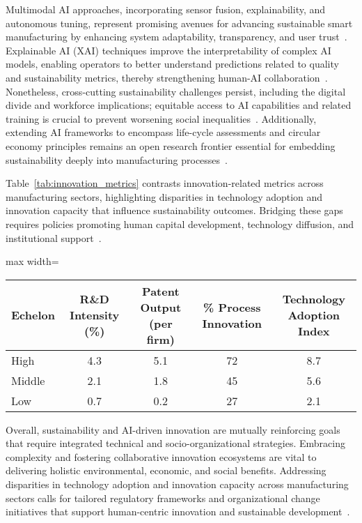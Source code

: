 \documentclass[sigconf]{acmart}
\begin{document}
Multimodal AI approaches, incorporating sensor fusion, explainability, and autonomous tuning, represent promising avenues for advancing sustainable smart manufacturing by enhancing system adaptability, transparency, and user trust~\cite{ref5,ref30}. Explainable AI (XAI) techniques improve the interpretability of complex AI models, enabling operators to better understand predictions related to quality and sustainability metrics, thereby strengthening human-AI collaboration~\cite{ref30}. Nonetheless, cross-cutting sustainability challenges persist, including the digital divide and workforce implications; equitable access to AI capabilities and related training is crucial to prevent worsening social inequalities~\cite{ref5}. Additionally, extending AI frameworks to encompass life-cycle assessments and circular economy principles remains an open research frontier essential for embedding sustainability deeply into manufacturing processes~\cite{ref38}.

Table~\ref{tab:innovation_metrics} contrasts innovation-related metrics across manufacturing sectors, highlighting disparities in technology adoption and innovation capacity that influence sustainability outcomes. Bridging these gaps requires policies promoting human capital development, technology diffusion, and institutional support~\cite{ref21}.

\begin{table*}[htbp]
\centering
\caption{Innovation and Technology Adoption Metrics Across Manufacturing Development Echelons~\cite{ref21}}
\label{tab:innovation_metrics}
\begin{adjustbox}{max width=\textwidth}
\begin{tabular}{@{}lcccc@{}}
\toprule
Echelon & R\&D Intensity (\%) & Patent Output (per firm) & \% Process Innovation & Technology Adoption Index \\ \midrule
High & 4.3 & 5.1 & 72 & 8.7 \\
Middle & 2.1 & 1.8 & 45 & 5.6 \\
Low & 0.7 & 0.2 & 27 & 2.1 \\ \bottomrule
\end{tabular}
\end{adjustbox}
\end{table*}

Overall, sustainability and AI-driven innovation are mutually reinforcing goals that require integrated technical and socio-organizational strategies. Embracing complexity and fostering collaborative innovation ecosystems are vital to delivering holistic environmental, economic, and social benefits. Addressing disparities in technology adoption and innovation capacity across manufacturing sectors calls for tailored regulatory frameworks and organizational change initiatives that support human-centric innovation and sustainable development~\cite{ref21}.
\end{document}
